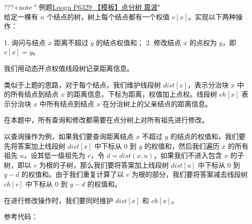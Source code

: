 \documentclass[
]{article}
\newenvironment{Shaded}{}{}
\newcommand{\NormalTok}[1]{#1}
\begin{document}
???+note " 例题\href{https://www.luogu.com.cn/problem/P6329}{Luogu P6329
【模板】点分树 \textbar{} 震波}"\\
给定一棵有 \(n\) 个结点的树，树上每个结点都有一个权值
\(v[x]\)。实现以下两种操作：\\

\begin{Shaded}
\begin{Highlighting}[]
\NormalTok{1. 询问与结点 $x$ 距离不超过 $y$ 的结点权值和；}
\NormalTok{2. 修改结点 $x$ 的点权为 $y$，即 $v[x]=y$。}
\end{Highlighting}
\end{Shaded}

我们用动态开点权值线段树记录距离信息。

类似于上题的思路，对于每个结点，我们维护线段树 \(dist[x]\)，表示分治块
\(x\) 中的所有结点到结点 \(x\)
的距离信息，下标为距离，权值加上点权。线段树 \(ch[x]\) 表示分治块 \(x\)
中所有结点到结点 \(x\) 在分治树上的父亲结点的距离信息。

在本题中，所有查询和修改都需要在点分树上对所有祖先进行修改。

以查询操作为例，如果我们要查询距离结点 \(x\) 不超过 \(y\)
的结点的权值和，我们要先将答案加上线段树 \(dist[x]\) 中下标从 \(0\) 到
\(y\) 的权值和，然后我们遍历 \(x\) 的所有祖先 \(u\)，设其低一级祖先为
\(v\)，令 \(d=dist(x,u)\)，如果我们不进入包含 \(x\) 的子树，即以 \(v\)
为根的子树，那么我们要将答案加上线段树 \(dist[u]\) 中下标从 \(0\) 到
\(y-d\) 的权值和。由于我们重复计算了以 \(v\)
为根的部分，我们要将答案减去线段树 \(ch[v]\) 中下标从 \(0\) 到 \(y-d\)
的权值和。

在进行修改操作时，我们要同时维护 \(dist[x]\) 和 \(ch[x]\)。

参考代码：
\end{document}
